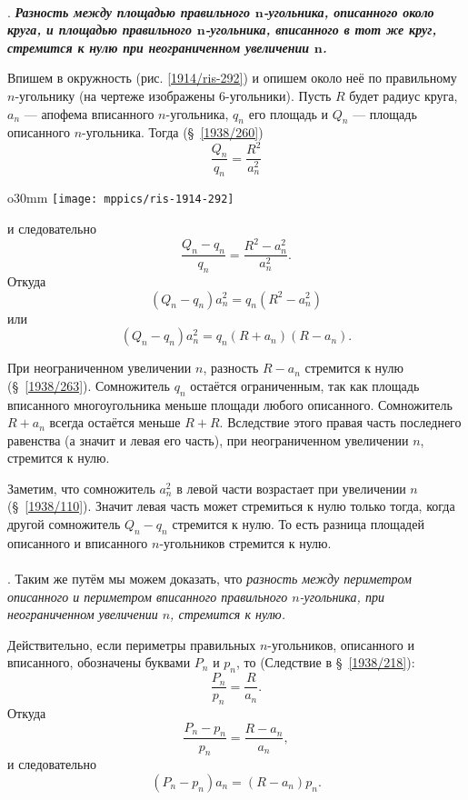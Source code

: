 \paragraph{}\label{1914/230}
.
\textbf{\emph{Разность между площадью правильного $\bm{n}$-угольника, описанного около круга, и площадью правильного $\bm{n}$-угольника, вписанного в тот же
круг, стремится к нулю при неограниченном увеличении $\bm{n}$.}}

Впишем в окружность (рис. \ref{1914/ris-292}) и опишем около неё по правильному $n$-угольнику (на чертеже изображены $6$-угольники).
Пусть $R$ будет радиус круга, $a_n$ — апофема вписанного $n$-угольника, $q_n$ его площадь и $Q_n$ — площадь описанного $n$-угольника.
Тогда (§~\ref{1938/260})
\[\frac {Q_n}{q_n}=\frac{R^2}{a_n^2}\]

\begin{wrapfigure}[12]{o}{30mm}
\vskip-4mm
\centering
\texttt{[image: mppics/ris-1914-292]}
\caption{}\label{1914/ris-292}
\end{wrapfigure}
\noindent
и следовательно 
\[\frac {Q_n-q_n}{q_n}=\frac{R^2-a_n^2}{a_n^2}.\]
Откуда
\[(Q_n-q_n)a_n^2=q_n(R^2-a_n^2)\]
или
\[(Q_n-q_n)a_n^2=q_n(R+a_n)(R-a_n).\]


При неограниченном увеличении $n$, разность $R-a_n$ стремится к нулю (§~\ref{1938/263}).
Сомножитель $q_n$ остаётся ограниченным, так как площадь вписанного многоугольника меньше площади любого описанного.  
Сомножитель $R+a_n$ всегда остаётся меньше $R+R$.
Вследствие этого правая часть последнего равенства (а значит и левая его часть),
при неограниченном увеличении $n$, стремится к нулю.

Заметим, что сомножитель $a_n^2$ в левой части возрастает при увеличении $n$ (§~\ref{1938/110}).
Значит левая часть может стремиться к нулю только тогда, когда другой сомножитель $Q_n-q_n$ стремится к нулю.
То есть разница площадей описанного и вписанного $n$-угольников стремится к нулю.

\paragraph{}\label{1914/231}
.
Таким же путём мы можем доказать, что \emph{разность между периметром описанного и
периметром вписанного правильного $n$-угольника, при неограниченном увеличении $n$, стремится к нулю.}

Действительно, если периметры правильных $n$-угольников, описанного и вписанного, обозначены буквами $P_n$ и $p_n$, то (Следствие в §~\ref{1938/218}):
\[\frac {P_n}{p_n}=\frac R{a_n}.\]
Откуда
\[\frac{P_n-p_n}{p_n}=\frac{R-a_n}{a_n},\]
и следовательно
\[(P_n-p_n)a_n=(R-a_n)p_n.\]

